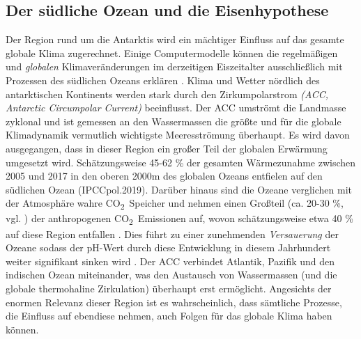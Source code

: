 \documentclass[12pt,a4paper,onecolumn,headheight=30pt]{scrartcl}
\newcommand{\cotwo}{CO\textsubscript{2}}
\begin{document}
\subsection{Der südliche Ozean und die Eisenhypothese} \label{sec:Eisenhypothese}
Der Region rund um die Antarktis wird ein mächtiger Einfluss auf das gesamte globale Klima zugerechnet. Einige Computermodelle können die regelmäßigen und \textit{globalen} Klimaveränderungen im derzeitigen Eiszeitalter ausschließlich mit Prozessen des südlichen Ozeans erklären \citep{Fischer.2010}. Klima und Wetter nördlich des antarktischen Kontinents werden stark durch den Zirkumpolarstrom \textit{(ACC, Antarctic Circumpolar Current)} beeinflusst. Der ACC umströmt die Landmasse zyklonal und ist gemessen an den Wassermassen die größte und für die globale Klimadynamik vermutlich wichtigste Meeresströmung überhaupt. Es wird davon ausgegangen, dass in dieser Region ein großer Teil der globalen Erwärmung umgesetzt wird. Schätzungsweise 45-62 \% der gesamten Wärmezunahme zwischen 2005 und 2017 in den oberen 2000m des globalen Ozeans entfielen auf den südlichen Ozean (IPCCpol.2019). Darüber hinaus sind die Ozeane verglichen mit der Atmosphäre wahre \cotwo \ Speicher und nehmen einen Großteil (ca. 20-30 \%, vgl. \citep{IPCCpol.2019}) der anthropogenen \cotwo \ Emissionen auf, wovon schätzungsweise etwa 40 \% auf diese Region entfallen \citep{Boning.2008}. Dies führt zu einer zunehmenden \textit{Versauerung} der Ozeane sodass der pH-Wert durch diese Entwicklung in diesem Jahrhundert weiter signifikant sinken wird \citep{IPCCpol.2019}. Der ACC verbindet Atlantik, Pazifik und den indischen Ozean miteinander, was den Austausch von Wassermassen (und die globale thermohaline Zirkulation) überhaupt erst ermöglicht. Angesichts der enormen Relevanz dieser Region ist es wahrscheinlich, dass sämtliche Prozesse, die Einfluss auf ebendiese nehmen, auch Folgen für das globale Klima haben können.
\end{document}
